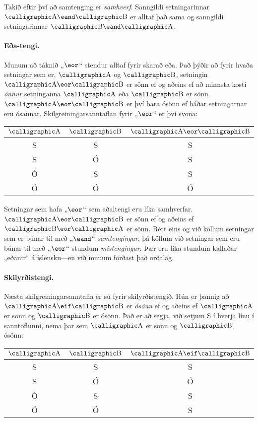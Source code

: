 Takið eftir því að samtenging er \emph{samhverf}. Sanngildi setningarinnar $\meta{A} \eand \meta{B}$ er alltaf það sama og sanngildi setningarinnar $\meta{B} \eand \meta{A}$.

\paragraph{Eða-tengi.} Munum að táknið „$\eor$“ stendur alltaf fyrir skarað eða. Það þýðir að fyrir hvaða setningar sem er, $\meta{A}$ og $\meta{B}$, setningin $\meta{A} \eor \meta{B}$ er sönn ef og aðeins ef að minnsta kosti \emph{önnur} setninganna $\meta{A}$ eða $\meta{B}$ er sönn. $\meta{A} \eor \meta{B}$ er því bara ósönn ef báðar setningarnar eru ósannar. Skilgreiningarsanntaflan fyrir „$\eor$“ er því svona:

\begin{center}
\begin{tabular}{c c|c}
$\meta{A}$ & $\meta{B}$ & $\meta{A}\eor\meta{B}$\\
\hline
S & S & S\\
S & Ó & S\\
Ó & S & S\\
Ó & Ó & Ó
\end{tabular}
\end{center}
Setningar sem hafa „$\eor$“ sem aðaltengi eru líka samhverfar. $\meta{A} \eor \meta{B}$ er sönn ef og aðeins ef $\meta{B} \eor \meta{A}$ er sönn. Rétt eins og við köllum setningar sem er búnar til með „$\eand$“ \emph{samtengingar}, þá köllum við setningar sem eru búnar til með „$\eor$“ stundum \emph{mistengingar}. Þær eru líka stundum kallaðar „eðanir“ á íslensku---en við munum forðast það orðalag.

\paragraph{Skilyrðistengi.} Næsta skilgreiningarsanntafla er sú fyrir skilyrðistengið. Hún er þannig að $\meta{A} \eif \meta{B}$ er \emph{ósönn} ef og aðeins ef $\meta{A}$ er sönn og $\meta{B}$ er ósönn. Það er að segja, við setjum S í hverja línu í sanntöflunni, nema þar sem $\meta{A}$ er sönn og $\meta{B}$ ósönn:

\begin{center}
\begin{tabular}{c c|c}
$\meta{A}$ & $\meta{B}$ & $\meta{A}\eif\meta{B}$\\
\hline
S & S & S\\
S & Ó & Ó\\
Ó & S & S\\
Ó & Ó & S
\end{tabular}
\end{center}

